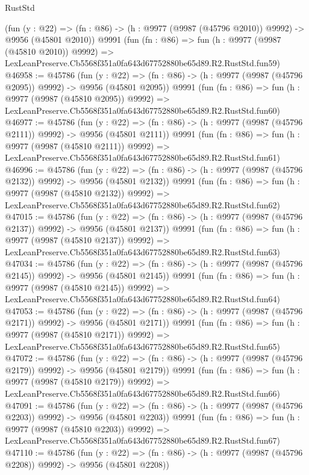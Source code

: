 \begin{lexlean}{RustStd}
\begin{coremodule}
    (fun (y : @22) =>
    (fn : @86) -> (h : @9977 (@9987 (@45796 @2010)) @9992) -> @9956 (@45801 @2010))
    @9991
    (fun (fn : @86) =>
    fun (h : @9977 (@9987 (@45810 @2010)) @9992) =>
    LexLeanPreserve.Cb5568f351a0fa643d67752880be65d89.R2.RustStd.fun59)
@46958 := @45786
    (fun (y : @22) =>
    (fn : @86) -> (h : @9977 (@9987 (@45796 @2095)) @9992) -> @9956 (@45801 @2095))
    @9991
    (fun (fn : @86) =>
    fun (h : @9977 (@9987 (@45810 @2095)) @9992) =>
    LexLeanPreserve.Cb5568f351a0fa643d67752880be65d89.R2.RustStd.fun60)
@46977 := @45786
    (fun (y : @22) =>
    (fn : @86) -> (h : @9977 (@9987 (@45796 @2111)) @9992) -> @9956 (@45801 @2111))
    @9991
    (fun (fn : @86) =>
    fun (h : @9977 (@9987 (@45810 @2111)) @9992) =>
    LexLeanPreserve.Cb5568f351a0fa643d67752880be65d89.R2.RustStd.fun61)
@46996 := @45786
    (fun (y : @22) =>
    (fn : @86) -> (h : @9977 (@9987 (@45796 @2132)) @9992) -> @9956 (@45801 @2132))
    @9991
    (fun (fn : @86) =>
    fun (h : @9977 (@9987 (@45810 @2132)) @9992) =>
    LexLeanPreserve.Cb5568f351a0fa643d67752880be65d89.R2.RustStd.fun62)
@47015 := @45786
    (fun (y : @22) =>
    (fn : @86) -> (h : @9977 (@9987 (@45796 @2137)) @9992) -> @9956 (@45801 @2137))
    @9991
    (fun (fn : @86) =>
    fun (h : @9977 (@9987 (@45810 @2137)) @9992) =>
    LexLeanPreserve.Cb5568f351a0fa643d67752880be65d89.R2.RustStd.fun63)
@47034 := @45786
    (fun (y : @22) =>
    (fn : @86) -> (h : @9977 (@9987 (@45796 @2145)) @9992) -> @9956 (@45801 @2145))
    @9991
    (fun (fn : @86) =>
    fun (h : @9977 (@9987 (@45810 @2145)) @9992) =>
    LexLeanPreserve.Cb5568f351a0fa643d67752880be65d89.R2.RustStd.fun64)
@47053 := @45786
    (fun (y : @22) =>
    (fn : @86) -> (h : @9977 (@9987 (@45796 @2171)) @9992) -> @9956 (@45801 @2171))
    @9991
    (fun (fn : @86) =>
    fun (h : @9977 (@9987 (@45810 @2171)) @9992) =>
    LexLeanPreserve.Cb5568f351a0fa643d67752880be65d89.R2.RustStd.fun65)
@47072 := @45786
    (fun (y : @22) =>
    (fn : @86) -> (h : @9977 (@9987 (@45796 @2179)) @9992) -> @9956 (@45801 @2179))
    @9991
    (fun (fn : @86) =>
    fun (h : @9977 (@9987 (@45810 @2179)) @9992) =>
    LexLeanPreserve.Cb5568f351a0fa643d67752880be65d89.R2.RustStd.fun66)
@47091 := @45786
    (fun (y : @22) =>
    (fn : @86) -> (h : @9977 (@9987 (@45796 @2203)) @9992) -> @9956 (@45801 @2203))
    @9991
    (fun (fn : @86) =>
    fun (h : @9977 (@9987 (@45810 @2203)) @9992) =>
    LexLeanPreserve.Cb5568f351a0fa643d67752880be65d89.R2.RustStd.fun67)
@47110 := @45786
    (fun (y : @22) =>
    (fn : @86) -> (h : @9977 (@9987 (@45796 @2208)) @9992) -> @9956 (@45801 @2208))

\end{coremodule}
\end{lexlean}
